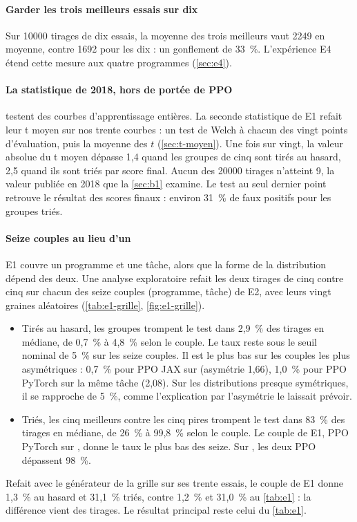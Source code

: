 \paragraph{Garder les trois meilleurs essais sur dix}
Sur \num{10000} tirages de dix essais, la moyenne des trois meilleurs vaut \num{2249} en moyenne, contre
\num{1692} pour les dix : un gonflement de 33~\%. L'expérience E4 étend cette mesure aux quatre programmes
(\cref{sec:e4}).

\paragraph{La statistique de 2018, hors de portée de PPO}
\textcite{henderson2018matters} testent des courbes d'apprentissage entières. La seconde statistique de E1
refait leur t moyen sur nos trente courbes : un test de Welch
à chacun des vingt points d'évaluation, puis la moyenne des $t$ (\cref{sec:t-moyen}). Une fois sur vingt, la
valeur absolue du t moyen dépasse 1,4 quand les groupes de cinq sont tirés au hasard, 2,5 quand ils sont triés
par score final. Aucun des \num{20000} tirages n'atteint 9, la valeur publiée en 2018 que la \cref{sec:b1}
examine. Le test au seul dernier point retrouve le résultat
des scores finaux : environ 31~\% de faux positifs pour les groupes triés.

\paragraph{Seize couples au lieu d'un}
E1 couvre un programme et une tâche, alors que la forme de la distribution dépend des deux. Une analyse
exploratoire refait les deux tirages de cinq contre cinq sur chacun
des seize couples (programme, tâche) de E2, avec leurs vingt graines aléatoires (\cref{tab:e1-grille},
\cref{fig:e1-grille}).
\begin{itemize}
  \item Tirés au hasard, les groupes trompent le test dans 2,9~\% des tirages en médiane, de 0,7~\% à 4,8~\%
    selon le couple. Le taux reste sous le seuil nominal de 5~\% sur les seize couples. Il est le plus bas sur
    les couples les plus asymétriques : 0,7~\% pour PPO JAX sur  (asymétrie 1,66), 1,0~\%
    pour PPO PyTorch sur la même tâche (2,08). Sur les distributions presque symétriques, il se rapproche de
    5~\%, comme l'explication par l'asymétrie le laissait prévoir.
  \item Triés, les cinq meilleurs contre les cinq pires trompent le test dans 83~\% des tirages en médiane,
    de 26~\% à 99,8~\% selon le couple. Le couple de E1, PPO PyTorch sur , donne le
    taux le plus bas des seize. Sur , les deux PPO dépassent 98~\%.
\end{itemize}
Refait avec le générateur de la grille sur ses trente essais, le couple de E1 donne 1,3~\% au hasard
et 31,1~\% triés, contre 1,2~\% et 31,0~\% au \cref{tab:e1} : la différence vient des tirages. Le résultat
principal reste celui du \cref{tab:e1}.


